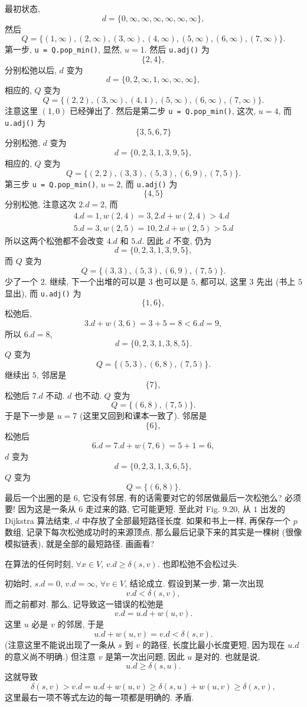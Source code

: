 \documentclass[a4paper]{ctexart}
\theoremstyle{definition}
\theoremstyle{definition}
\begin{document}
最初状态,
$$
d = \{0, \infty, \infty, \infty, \infty, \infty, \infty\},
$$
然后
$$
Q = \{(1, \infty), (2, \infty), (3, \infty), (4, \infty), (5, \infty), (6, \infty), (7, \infty)\}.
$$
第一步, \verb|u = Q.pop_min()|, 显然, $u = 1$. 然后 \verb|u.adj()| 为
$$
\{2, 4\},
$$
分别松弛以后, $d$ 变为
$$
d = \{0, 2, \infty, 1, \infty, \infty, \infty\},
$$
相应的, $Q$ 变为
$$
Q = \{(2, 2), (3, \infty), (4, 1), (5, \infty), (6, \infty), (7, \infty)\}.
$$
注意这里 $(1, 0)$ 已经弹出了. 然后是第二步 \verb|u = Q.pop_min()|, 这次, $u = 4$,
而 \verb|u.adj()| 为
$$
\{3, 5, 6, 7\}
$$
分别松弛, $d$ 变为
$$
d = \{0, 2, 3, 1, 3, 9, 5\},
$$
相应的, $Q$ 变为
$$
Q = \{(2, 2), (3, 3), (5, 3), (6, 9), (7, 5)\}.
$$
第三步 \verb|u = Q.pop_min()|, $u = 2$,
而 \verb|u.adj()| 为
$$
\{4, 5\}
$$
分别松弛, 注意这次 $2.d = 2$, 而
$$
\begin{array}{r}
  4.d = 1, w(2, 4) = 3, 2.d + w(2, 4) > 4.d \\
  5.d = 3, w(2, 5) = 10, 2.d + w(2, 5) > 5.d
\end{array}
$$
所以这两个松弛都不会改变 $4.d$ 和 $5.d$. 因此 $d$ 不变, 仍为
$$
d = \{0, 2, 3, 1, 3, 9, 5\},
$$
而
$Q$ 变为
$$
Q = \{(3, 3), (5, 3), (6, 9), (7, 5)\}.
$$
少了一个 $2$. 继续, 下一个出堆的可以是 $3$ 也可以是 $5$, 都可以, 这里 $3$ 先出
(书上 $5$ 显出), 而 \verb|u.adj()| 为
$$
\{1, 6\},
$$
松弛后,
$$
3.d + w(3, 6) = 3 + 5 = 8 < 6.d = 9,
$$
所以 $6.d = 8$, 
$$
d = \{0, 2, 3, 1, 3, 8, 5\}.
$$
$Q$ 变为
$$
Q = \{(5, 3), (6, 8), (7, 5)\}.
$$
继续出 $5$, 邻居是
$$
\{7\},
$$
松弛后 $7.d$ 不动. $d$ 也不动. $Q$ 变为
$$
Q = \{(6, 8), (7, 5)\}.
$$
于是下一步是 $u = 7$ (这里又回到和课本一致了). 邻居是
$$
\{6\},
$$
松弛后
$$
6.d = 7.d + w(7, 6) = 5 + 1 = 6,
$$
$d$ 变为
$$
d = \{0, 2, 3, 1, 3, 6, 5\},
$$
$Q$ 变为
$$
Q = \{(6, 8)\}.
$$
最后一个出圈的是 $6$, 它没有邻居,
有的话需要对它的邻居做最后一次松弛么? 必须要! 因为这是一条从 $6$ 走过来的路,
它可能更短. 至此对 Fig. 9.20, 从 $1$ 出发的 Dijkstra 算法结束, $d$
中存放了全部最短路径长度. 如果和书上一样, 再保存一个 $p$ 数组,
记录下每次松弛成功时的来源顶点, 那么最后记录下来的其实是一棵树 (很像模拟链表),
就是全部的最短路径. 画画看?

 在算法的任何时刻, $\forall x \in V$,
$v.d \geq \delta(s, v)$. 也即松弛不会松过头. 

 初始时, $s.d = 0$, $v.d = \infty$, $\forall v \in V$,
结论成立. 假设到某一步, 第一次出现
$$
v.d < \delta(s, v),
$$
而之前都对. 那么, 记导致这一错误的松弛是
$$
v.d = u.d + w(u, v).
$$
这里 $u$ 必是 $v$ 的邻居, 于是
$$
u.d + w(u, v) = v.d < \delta(s, v).
$$
(注意这里不能说出现了一条从 $s$ 到 $v$ 的路径, 长度比最小长度更短, 因为现在 $u.d$ 的意义尚不明确.)
但注意 $v$ 是第一次出问题, 因此 $u$ 是对的. 也就是说,
$$
u.d \geq \delta(s, u).
$$
这就导致
$$
\delta(s, v) > v.d = u.d + w(u, v) \geq \delta(s, u) + w(u, v) \geq \delta(s, v), 
$$
这里最右一项不等式左边的每一项都是明确的. 矛盾.
\end{document}
